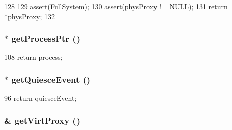 \begin{DoxyCode}
128 {
129     assert(FullSystem);
130     assert(physProxy != NULL);
131     return *physProxy;
132 }
\end{DoxyCode}
\hypertarget{structThreadState_a4b26cb784639047bab9de2b306955c4b}{
\subsubsection[{getProcessPtr}]{$\ast$ getProcessPtr ()}}
\label{structThreadState_a4b26cb784639047bab9de2b306955c4b}



\begin{DoxyCode}
108 { return process; }
\end{DoxyCode}
\hypertarget{structThreadState_a0546f73d19db75274e9d0bc63c5f5908}{
\subsubsection[{getQuiesceEvent}]{$\ast$ getQuiesceEvent ()}}
\label{structThreadState_a0546f73d19db75274e9d0bc63c5f5908}



\begin{DoxyCode}
96 { return quiesceEvent; }
\end{DoxyCode}
\hypertarget{structThreadState_a03a07ebd804051b18b69156c2fff36a3}{
\subsubsection[{getVirtProxy}]{ \& getVirtProxy ()}}
\label{structThreadState_a03a07ebd804051b18b69156c2fff36a3}



